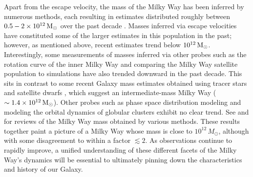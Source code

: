 Apart from the escape velocity, the mass of the Milky Way has been inferred by numerous methods, each resulting in estimates distributed roughly between $0.5-2\times 10^{12}\,\rm{M}_\odot$ over the past decade \citep{wang:2020}. Masses inferred via escape velocities have constituted some of the larger estimates in this population in the past; however, as mentioned above, recent estimates trend below $10^{12}\,\rm{M}_\odot$. Interestingly, some measurements of masses inferred via other probes such as the rotation curve of the inner Milky Way \citep{Ou:2023, Francesco:2023, 2023arXiv230900048J, 2023ApJ...946...73Z} and comparing the Milky Way satellite population to simulations \citep{barber:2014, cautun:2014, patel:2018} have also trended downward in the past decade. This sits in contrast to some recent Galaxy mass estimates obtained using tracer stars \citep{Shen:2022} and satellite dwarfs \citep{fritz:2020, Slizewski:2022}, which suggest an intermediate-mass Milky Way ($\sim 1.4\times 10^{12}\,\rm{M_\odot}$). Other probes such as phase space distribution modeling \citep{li:2020, callingham:2019} and modeling the orbital dynamics of globular clusters \citep{sohn:2018,watkins:2019,Jianling:2022} exhibit no clear trend. See \cite{wang:2020} and \cite{Sawala:2023} for reviews of the Milky Way mass obtained by various methods. These results together paint a picture of a Milky Way whose mass is close to $10^{12}\,M_\odot$, although with some disagreement to within a factor $\lesssim 2$. As observations continue to rapidly improve, a unified understanding of these different facets of the Milky Way's dynamics will be essential to ultimately pinning down the characteristics and history of our Galaxy.
